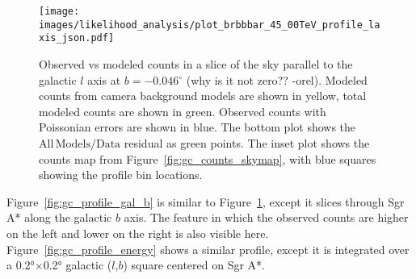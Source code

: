   \begin{figure}[t]
    \centering
    \texttt{[image: images/likelihood\_analysis/plot\_brbbbar\_45\_00TeV\_profile\_laxis\_json.pdf]}
    \caption[Galactic Center Profile vs Galactic $l$]{
      Observed vs modeled counts in a slice of the sky parallel to the galactic $l$ axis at $b=-0.046{}^{\circ}$ {\color{red}(why is it not zero?? -orel)}.
      Modeled counts from camera background models are shown in yellow, total modeled counts are shown in green.
      Observed counts with Poissonian errors are shown in blue.
      The bottom plot shows the $\mathrm{All\,Models}/\mathrm{Data}$ residual as green points.
      The inset plot shows the counts map from Figure~\ref{fig:gc_counts_skymap}, with blue squares showing the profile bin locations.
    }
    \label{fig:gc_profile_gal_l}
  \end{figure}

  Figure~\ref{fig:gc_profile_gal_b} is similar to Figure~\ref{fig:gc_profile_gal_l}, except it slices through Sgr A* along the galactic $b$ axis.
  The feature in which the observed counts are higher on the left and lower on the right is also visible here.
  Figure~\ref{fig:gc_profile_energy} shows a similar profile, except it is integrated over a \ang{0.2}$\times$\ang{0.2} galactic ($l$,$b$) square centered on Sgr A*.

